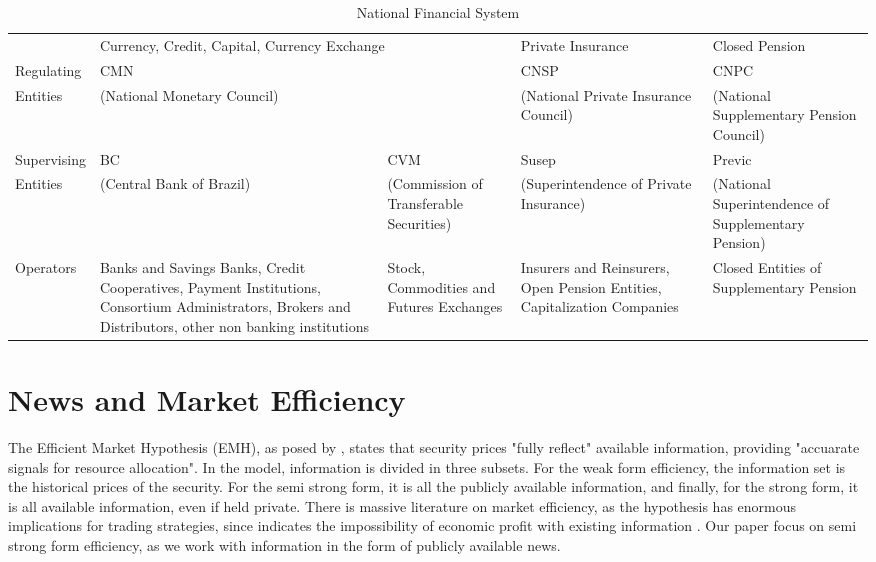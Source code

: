 \documentclass[cic,tc, english]{iiufrgs}
\begin{document}
    \begin{table}[H]
        \caption{National Financial System}
        \label{tab:sistemanacional}
        \centering
        \begin{tabular}{lp{2.3cm}|p{2.3cm}|p{2.3cm}|p{2.3cm}}
             & \multicolumn{2}{p{4.6cm}||}{Currency, Credit, Capital, Currency Exchange} & \multicolumn{1}{l||}{Private Insurance} & \multicolumn{1}{l}{Closed Pension} \\ \cline{2-5} 
            \multicolumn{1}{l|}{Regulating} & \multicolumn{2}{l||}{CMN} & \multicolumn{1}{p{2.3cm}||}{CNSP} & \multicolumn{1}{p{2.3cm}|}{CNPC} \\
            \multicolumn{1}{l|}{Entities} & \multicolumn{2}{l||}{(National Monetary Council)} & \multicolumn{1}{p{2.75cm}||}{(National Private Insurance Council)} & \multicolumn{1}{p{2.3cm}|}{(National Supplementary Pension Council)} \\ \hline
            \multicolumn{1}{l|}{Supervising} & \multicolumn{1}{p{2.3cm}||}{BC} & \multicolumn{1}{p{2.3cm}||}{CVM} & \multicolumn{1}{p{2.3cm}||}{Susep} & \multicolumn{1}{p{2.3cm}|}{Previc} \\
            \multicolumn{1}{l|}{Entities} & \multicolumn{1}{p{2.3cm}||}{(Central Bank of Brazil)} & \multicolumn{1}{p{2.3cm}||}{(Commission of Transferable Securities)} & \multicolumn{1}{p{2.75cm}||}{(Superintendence of Private Insurance)} & \multicolumn{1}{p{2.3cm}|}{(National Superintendence of Supplementary Pension)} \\ \hline
            \multicolumn{1}{l|}{Operators} & \multicolumn{1}{p{2.3cm}||}{Banks and Savings Banks,  Credit Cooperatives, Payment Institutions, Consortium Administrators, Brokers and Distributors, other non banking institutions} & \multicolumn{1}{p{2.3cm}||}{Stock, Commodities and Futures Exchanges} & \multicolumn{1}{p{2.75cm}||}{Insurers and Reinsurers, Open Pension Entities, Capitalization Companies} & \multicolumn{1}{p{2.3cm}|}{Closed Entities of Supplementary Pension} \\ \cline{2-5} 
        \end{tabular}
    \end{table}

\chapter{News and Market Efficiency} \label{chapter_literature}

    The Efficient Market Hypothesis (EMH), as posed by \citet{fama1970}, states that security prices "fully reflect" available information, providing "accuarate signals for resource allocation". In the model, information is divided in three subsets. For the weak form efficiency, the information set is the historical prices of the security. For the semi strong form, it is all the publicly available information, and finally, for the strong form, it is all available information, even if held private. There is massive literature on market efficiency, as the hypothesis has enormous implications for trading strategies, since indicates the impossibility of economic profit with existing information \citet{kamal2014}. Our paper focus on semi strong form efficiency, as we work with information in the form of publicly available news.
\end{document}
